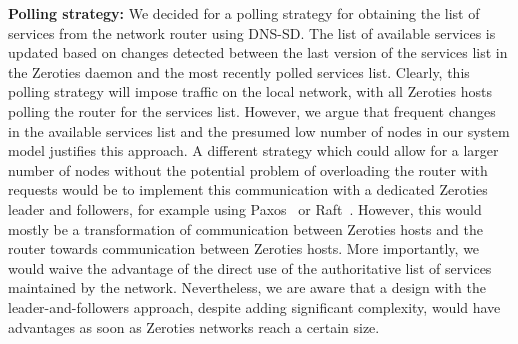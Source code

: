 \textbf{Polling strategy:}
We decided for a polling strategy for obtaining the list of services from the network router using DNS-SD.
The list of available services is updated based on changes detected between the last version of the services list in the Zeroties daemon and the most recently polled services list.
Clearly, this polling strategy will impose traffic on the local network, with all Zeroties hosts polling the router for the services list.
However, we argue that frequent changes in the available services list and the presumed low number of nodes in our system model justifies this approach.
A different strategy which could allow for a larger number of nodes without the potential problem of overloading the router with requests would be to implement this communication with a dedicated Zeroties leader and followers, for example using Paxos~\cite{lamport_2001} or Raft~\cite{ongaro_2014}.
However, this would mostly be a transformation of communication between Zeroties hosts and the router towards communication between Zeroties hosts. 
More importantly, we would waive the advantage of the direct use of the authoritative list of services maintained by the network.
Nevertheless, we are aware that a design with the leader-and-followers approach, despite adding significant complexity, would have advantages as soon as Zeroties networks reach a certain size.


